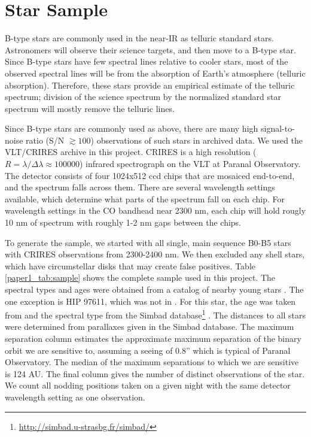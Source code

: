 \section{Star Sample}
\label{paper1_sec:sample}
B-type stars are commonly used in the near-IR as telluric
standard stars. Astronomers will observe their science targets, and
then move to a B-type star. Since B-type stars have few
spectral lines relative to cooler stars, most of the observed
spectral lines will be from the absorption of Earth's atmosphere
(telluric absorption). Therefore, these stars provide an empirical
estimate of the telluric spectrum; division of the science spectrum by
the normalized standard star spectrum will mostly remove the telluric
lines. 

Since B-type stars are commonly used as above, there are
many high signal-to-noise ratio (S/N $\gtrsim 100$)
observations of such stars in archived data. We used the VLT/CRIRES
archive in this project. CRIRES is a high
resolution ($R = \lambda / \Delta \lambda \approx 100000$) infrared
spectrograph on the VLT at Paranal Observatory. The detector consists of four
1024x512 ccd chips that are mosaiced end-to-end, and
the spectrum falls across them. There are several wavelength settings
available, which determine what parts of the spectrum fall on each 
chip. For wavelength settings in the CO
bandhead near 2300 nm, each chip will hold rougly 10 nm of spectrum
with roughly 1-2 nm gaps between the chips.

To generate the sample, we started with all single, main sequence B0-B5 stars 
with CRIRES observations from 2300-2400 nm. We then excluded any shell stars, which have circumstellar disks \citep{Porter2003} that may create
false positives. Table \ref{paper1_tab:sample} shows the complete sample used in this
project. The spectral types and ages were obtained from a catalog of nearby
young stars \citep{Tetzlaff2010}. The one exception is HIP 97611, which was
not in \cite{Tetzlaff2010}. For this star, the age was taken from
\cite{Westin1985} and the spectral type from the Simbad database\footnote{\url{http://simbad.u-strasbg.fr/simbad/}}
. The distances to all stars were
determined from parallaxes given in the Simbad database. The maximum
separation column estimates the approximate maximum separation of the binary
orbit we are sensitive to, assuming a seeing of 0.8'' which is typical of
Paranal Observatory. The median of the maximum separations to which we are sensitive is 124
AU.  The final column gives the number of distinct observations of the
star. We count all nodding positions taken on a given night with the same 
detector wavelength setting as one observation.


